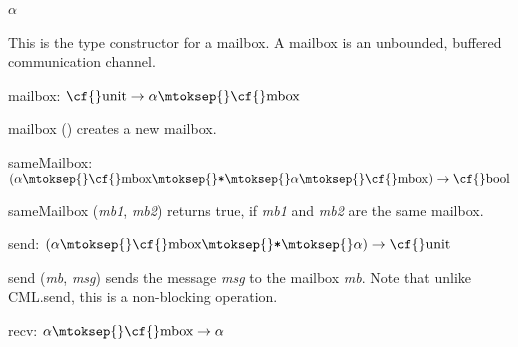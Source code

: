 \begin{descr}
\item {}{} \(\alpha\)~\label{ty-MAILBOX.mbox}

\begin{speccomment}
\item 

	This is the type constructor for a mailbox. 	A mailbox is an unbounded, buffered communication channel.     \end{speccomment}
\item {}{} {\cf mailbox: \(\mbox{\cf{}unit}\rightarrow \alpha\mtoksep{}\mbox{\cf{}mbox}\)}\label{val-MAILBOX.mailbox}


\begin{speccomment}
\item {\cf \small mailbox ()         } 
creates a new mailbox.     \end{speccomment}
\item {}{} {\cf sameMailbox: \((\alpha\mtoksep{}\mbox{\cf{}mbox}\mtoksep{}\verb,*,\mtoksep{}\alpha\mtoksep{}\mbox{\cf{}mbox})\rightarrow \mbox{\cf{}bool}\)}\label{val-MAILBOX.sameMailbox}


\begin{speccomment}
\item {\cf \small same\-Mailbox (\mbox{\cf \small \textit{mb1}}, \mbox{\cf \small \textit{mb2}})         } 
returns {\cf \small true}, if \mbox{\cf \small \textit{mb1}} and \mbox{\cf \small \textit{mb2}} are the same mailbox.     \end{speccomment}
\item {}{} {\cf send: \((\alpha\mtoksep{}\mbox{\cf{}mbox}\mtoksep{}\verb,*,\mtoksep{}\alpha)\rightarrow \mbox{\cf{}unit}\)}\label{val-MAILBOX.send}


\begin{speccomment}
\item {\cf \small send (\mbox{\cf \small \textit{mb}}, \mbox{\cf \small \textit{msg}})         } 
sends the message \mbox{\cf \small \textit{msg}} to the mailbox \mbox{\cf \small \textit{mb}}. 	Note that unlike {\cf \small CML.\-send}, this is a non-blocking 	operation.     \end{speccomment}
\item {}{} {\cf recv: \(\alpha\mtoksep{}\mbox{\cf{}mbox}\rightarrow \alpha\)}\label{val-MAILBOX.recv}



\end{descr}
